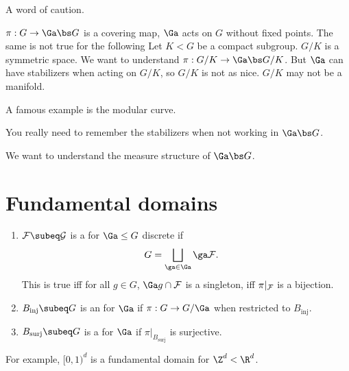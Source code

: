 A word of caution.
\begin{rem}
$\pi:G\to \Ga\bs G$ is a covering map, $\Ga$ acts on $G$ without fixed points. 
The same is not true for the following
Let $K<G$ be a compact subgroup. $G/K$ is a symmetric space. We want to understand $\pi: G/K \to \Ga\bs G /K$. But $\Ga$ can have stabilizers when acting on $G/K$, so $G/K$ is not as nice. $G/K$ may not be a manifold. 

A famous example is the modular curve.

You really need to remember the stabilizers when not working in $\Ga\bs G$. 
\end{rem}
We want to understand the measure structure of $\Ga\bs G$. 

\section{Fundamental domains}
\begin{df}
\begin{enumerate}
\item
$\cal F\subeq G$ is a  for $\Ga\le G$ discrete if 
\begin{align}
G&=\bigsqcup_{\ga\in \Ga} \ga \cal F.
\end{align}
This is true iff  for all $g\in G$, $\Ga g\cap \cal F$ is a singleton, iff $\pi|_{\cal F}$ is a bijection.
\item
$B_{\text{inj}}\subeq G$ is an  for $\Ga$ if $\pi:G\to G/\Ga$ when restricted to $B_{\text{inj}}$. 
\item
$B_{\text{surj}}\subeq G$ is a  for $\Ga$ if $\pi|_{B_{\text{surj}}}$ is surjective.
\end{enumerate}
\end{df}
For example, $[0,1)^d$ is a fundamental domain for $\Z^d<\R^d$. 

